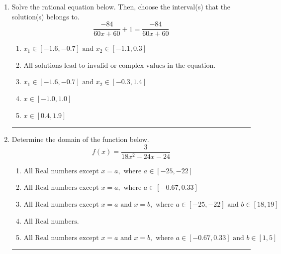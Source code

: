 \documentclass[14pt]{extbook}
\newcommand{\litem}[1]{\item#1\hspace*{-1cm}\rule{\textwidth}{0.4pt}}
\begin{document}
\begin{enumerate}
{\begin{enumerate}[label=\Alph*.]
\end{enumerate} }
\litem{
Solve the rational equation below. Then, choose the interval(s) that the solution(s) belongs to.\[ \frac{-84}{60x + 60} + 1 = \frac{-84}{60x + 60} \]\begin{enumerate}[label=\Alph*.]
\item \( x_1 \in [-1.6, -0.7] \text{ and } x_2 \in [-1.1,0.3] \)
\item \( \text{All solutions lead to invalid or complex values in the equation.} \)
\item \( x_1 \in [-1.6, -0.7] \text{ and } x_2 \in [-0.3,1.4] \)
\item \( x \in [-1.0,1.0] \)
\item \( x \in [0.4,1.9] \)

\end{enumerate} }
\litem{
Determine the domain of the function below.\[ f(x) = \frac{3}{18x^{2} -24 x -24} \]\begin{enumerate}[label=\Alph*.]
\item \( \text{All Real numbers except } x = a, \text{ where } a \in [-25, -22] \)
\item \( \text{All Real numbers except } x = a, \text{ where } a \in [-0.67, 0.33] \)
\item \( \text{All Real numbers except } x = a \text{ and } x = b, \text{ where } a \in [-25, -22] \text{ and } b \in [18, 19] \)
\item \( \text{All Real numbers.} \)
\item \( \text{All Real numbers except } x = a \text{ and } x = b, \text{ where } a \in [-0.67, 0.33] \text{ and } b \in [1, 5] \)


\end{enumerate}}
\end{enumerate}
\end{document}
